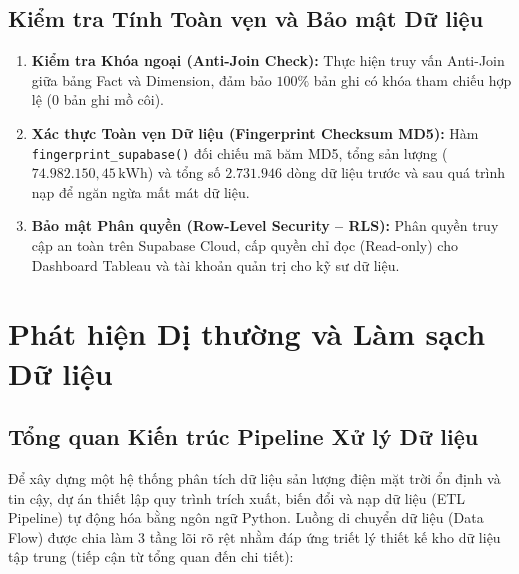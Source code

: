 \documentclass[12pt, a4paper]{report}
\begin{document}
\section{Kiểm tra Tính Toàn vẹn và Bảo mật Dữ liệu}
\label{sec:integrity_security}

\begin{enumerate}[noitemsep]
    \item \textbf{Kiểm tra Khóa ngoại (Anti-Join Check):} Thực hiện truy vấn Anti-Join giữa bảng Fact và Dimension, đảm bảo $100\%$ bản ghi có khóa tham chiếu hợp lệ (0 bản ghi mồ côi).
    \item \textbf{Xác thực Toàn vẹn Dữ liệu (Fingerprint Checksum MD5):} Hàm \texttt{fingerprint\_supabase()} đối chiếu mã băm MD5, tổng sản lượng ($74.982.150{,}45\,\text{kWh}$) và tổng số $2.731.946$ dòng dữ liệu trước và sau quá trình nạp để ngăn ngừa mất mát dữ liệu.
    \item \textbf{Bảo mật Phân quyền (Row-Level Security -- RLS):} Phân quyền truy cập an toàn trên Supabase Cloud, cấp quyền chỉ đọc (Read-only) cho Dashboard Tableau và tài khoản quản trị cho kỹ sư dữ liệu.
\end{enumerate}

\newpage
\chapter{Phát hiện Dị thường và Làm sạch Dữ liệu}
\label{chap:outlier_cleaning}

\section{Tổng quan Kiến trúc Pipeline Xử lý Dữ liệu}
\label{sec:pipeline_overview}

Để xây dựng một hệ thống phân tích dữ liệu sản lượng điện mặt trời ổn định và tin cậy, dự án thiết lập quy trình trích xuất, biến đổi và nạp dữ liệu (ETL Pipeline) tự động hóa bằng ngôn ngữ Python. Luồng di chuyển dữ liệu (Data Flow) được chia làm 3 tầng lõi rõ rệt nhằm đáp ứng triết lý thiết kế kho dữ liệu tập trung (tiếp cận từ tổng quan đến chi tiết):
\end{document}
